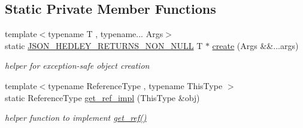 \subsection*{Static Private Member Functions}
\begin{DoxyCompactItemize}
\item 
{\footnotesize template$<$typename T , typename... Args$>$ }\\static \hyperlink{json_8hpp_a5f2aaec3b681d0a72f7d6e90b70cdcd1}{J\+S\+O\+N\+\_\+\+H\+E\+D\+L\+E\+Y\+\_\+\+R\+E\+T\+U\+R\+N\+S\+\_\+\+N\+O\+N\+\_\+\+N\+U\+LL} T $\ast$ \hyperlink{classnlohmann_1_1basic__json_a49cba7a0d3a355161e2b62b437b80936}{create} (Args \&\&...args)
\begin{DoxyCompactList}\small\item\em helper for exception-\/safe object creation \end{DoxyCompactList}\item 
{\footnotesize template$<$typename Reference\+Type , typename This\+Type $>$ }\\static Reference\+Type \hyperlink{classnlohmann_1_1basic__json_af9091a59efebd38435cbc0583fcda777}{get\+\_\+ref\+\_\+impl} (This\+Type \&obj)
\begin{DoxyCompactList}\small\item\em helper function to implement \hyperlink{classnlohmann_1_1basic__json_a14ddc6e0f6d70296bc81f810254076c5}{get\+\_\+ref()} \end{DoxyCompactList}\end{DoxyCompactItemize}
